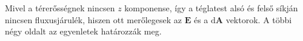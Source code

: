 Mivel a térerősségnek nincsen $z$ komponense, így a téglatest alsó és felső síkján nincsen fluxusjárulék, hiszen ott merőlegesek az $\mathbf{E}$ és a $\mathrm{d}\mathbf{A}$ vektorok. A többi négy oldalt az 
egyenletek határozzák meg. 

